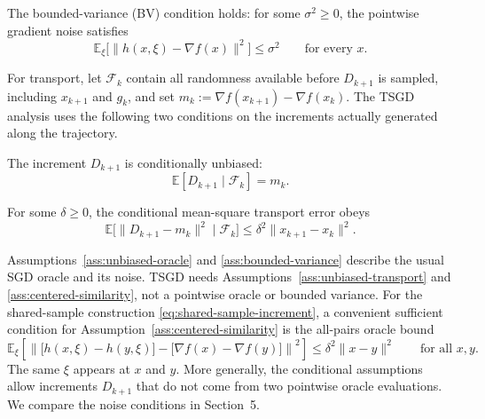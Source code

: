 \begin{assumption}
\label{ass:bounded-variance}
The bounded-variance (BV) condition holds: for some $\sigma^2\geq0$,
the pointwise gradient noise satisfies
\begin{equation}
\label{eq:bounded-variance}
\mathbb{E}_{\xi}\bigl[\|h(x,\xi)-\nabla f(x)\|^2\bigr]
  \leq \sigma^2
\qquad\text{for every }x.
\end{equation}
\end{assumption}

For transport, let $\mathcal F_k$ contain all randomness available before
$D_{k+1}$ is sampled, including $x_{k+1}$ and $g_k$, and set
$m_k:=\nabla f(x_{k+1})-\nabla f(x_k)$. The TSGD analysis uses the following
two conditions on the increments actually generated along the trajectory.

\begin{assumption}
\label{ass:unbiased-transport}
The increment $D_{k+1}$ is conditionally unbiased:
\begin{equation}
\label{eq:unbiased-transport}
\mathbb{E}[D_{k+1}\mid\mathcal F_k]=m_k.
\end{equation}
\end{assumption}

\begin{assumption}
\label{ass:centered-similarity}
For some $\delta\geq0$, the conditional mean-square transport error obeys
\begin{equation}
\label{eq:centered-similarity}
\mathbb{E}\bigl[\|D_{k+1}-m_k\|^2\mid\mathcal F_k\bigr]
  \leq\delta^2\|x_{k+1}-x_k\|^2.
\end{equation}
\end{assumption}

Assumptions~\ref{ass:unbiased-oracle} and \ref{ass:bounded-variance}
describe the usual SGD oracle and its noise. TSGD needs
Assumptions~\ref{ass:unbiased-transport} and
\ref{ass:centered-similarity}, not a pointwise oracle or bounded variance.
For the shared-sample construction \eqref{eq:shared-sample-increment}, a
convenient sufficient condition for Assumption~\ref{ass:centered-similarity}
is the all-pairs oracle bound
\begin{equation}
\label{eq:oracle-similarity}
\mathbb{E}_{\xi}\left[
\left\|
  \bigl[h(x,\xi)-h(y,\xi)\bigr]
  -\bigl[\nabla f(x)-\nabla f(y)\bigr]
\right\|^2\right]
  \leq\delta^2\|x-y\|^2
\qquad\text{for all }x,y.
\end{equation}
The same $\xi$ appears at $x$ and $y$. More generally, the conditional
assumptions allow increments $D_{k+1}$ that do not come from two pointwise
oracle evaluations. We compare the noise conditions in Section~5.

